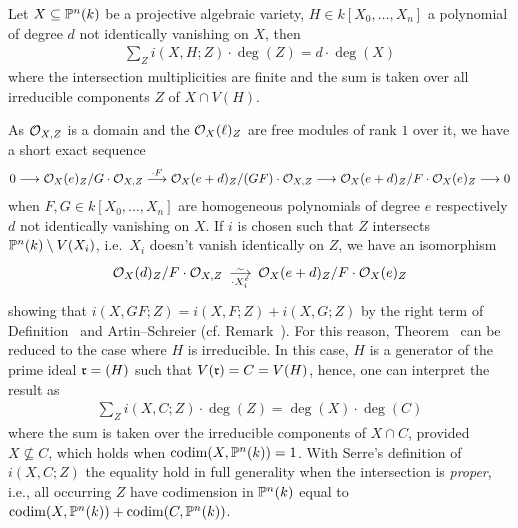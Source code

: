 \documentclass[a4paper,parskip=half,numbers=enddot, DIV=12]{scrreprt}
\begin{document}
\begin{thm} 
    Let $X\subseteq \mathbb{P}^n(k)$ be a projective algebraic variety, $H\in k[X_0,\ldots, X_n]$ a polynomial of degree $d$ not identically vanishing on $X$, then 
    \begin{align*}
        \sum_{Z} i(X,H;Z) \cdot \deg(Z) = d\cdot\deg (X)
    \end{align*}
    where the intersection multiplicities are finite and the sum is taken over all irreducible components $Z$ of $X\cap V(H)$.
\end{thm}
\begin{rem*}
    As $\mathcal{O}_{X,Z}$ is a domain and the $\mathcal{O}_X(\ell)_Z$ are free modules of rank $1$ over it, we have a short exact sequence
    \begin{align*}
        0\morphism \Oo_X(e)_Z/G\cdot \Oo_{X,Z} \morphism[\cdot F] \Oo_X(e+d)_Z/(GF)\cdot \Oo_{X,Z} \morphism \Oo_X(e+d)_Z/F\cdot \Oo_X(e)_Z \morphism 0
    \end{align*}
    when $F,G\in k[X_0,\ldots,X_n]$ are homogeneous polynomials of degree $e$ respectively $d$ not identically vanishing on $X$. If $i$ is chosen such that $Z$ intersects $\mathbb{P}^n(k)\setminus V(X_i)$, i.e.\ $X_i$ doesn't vanish identically on $Z$, we have an isomorphism
    \begin{align*}
        \Oo_X(d)_Z/ F\cdot \Oo_{X,Z} \isomorphism[\cdot X_i^e] \Oo_X(e+d)_Z/F\cdot \Oo_X(e)_Z
    \end{align*}
    showing that $i(X, GF; Z) = i(X,F;Z)+i(X,G;Z)$ by the right term of Definition~ and Artin--Schreier (cf. Remark~). For this reason, Theorem~ can be reduced to the case where $H$ is irreducible. In this case, $H$ is a generator of the prime ideal $\mathfrak{r}=(H)$ such that $V(\mathfrak{r}) = C = V(H)$, hence, one can interpret the result as
    \begin{align*}
        \sum_Z i(X,C;Z) \cdot \deg (Z) = \deg(X)\cdot \deg(C)
    \end{align*}
    where the sum is taken over the irreducible components of $X\cap C$, provided $X\not \subseteq C$, which holds when $\operatorname{codim}(X,\mathbb{P}^n(k)) = 1$. With Serre's definition of $i(X,C;Z)$ the equality hold in full generality when the intersection is \emph{proper}, i.e., all occurring $Z$ have codimension in $\mathbb{P}^n(k)$ equal to $\operatorname{codim} (X,\mathbb{P}^n(k)) +\operatorname{codim}(C, \mathbb{P}^n(k))$.
    

\end{rem*}
\end{document}
